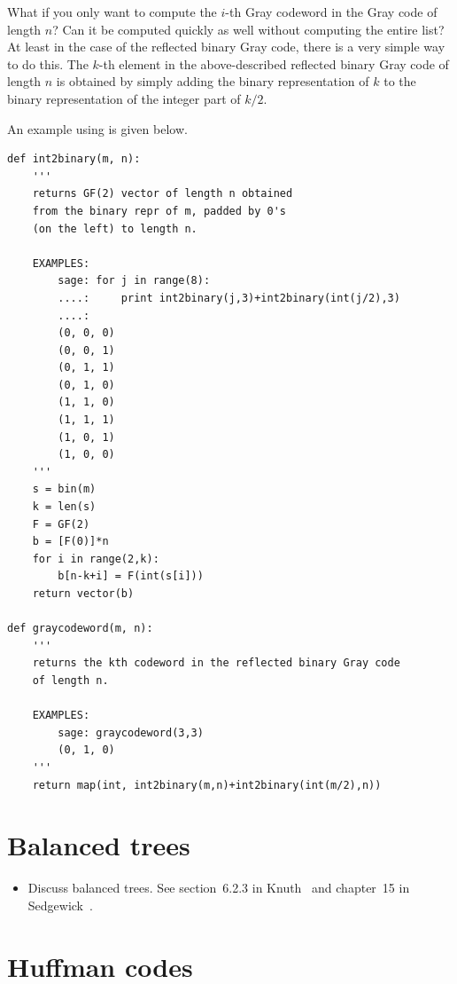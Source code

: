 What if you only want to compute the
$i$-th Gray codeword in the Gray code of length $n$?
Can it be computed quickly as well without computing the
entire list?
At least in the case of the reflected binary Gray code, there
is a very simple way to do this. The $k$-th element in the
above-described reflected binary Gray code of length $n$
is obtained by simply adding the binary representation of
$k$ to the binary representation of the integer part of
$k/2$.

An example using \sage is given below.

\begin{lstlisting}
def int2binary(m, n):
    '''
    returns GF(2) vector of length n obtained
    from the binary repr of m, padded by 0's
    (on the left) to length n.

    EXAMPLES:
        sage: for j in range(8):
        ....:     print int2binary(j,3)+int2binary(int(j/2),3)
        ....:
        (0, 0, 0)
        (0, 0, 1)
        (0, 1, 1)
        (0, 1, 0)
        (1, 1, 0)
        (1, 1, 1)
        (1, 0, 1)
        (1, 0, 0)
    '''
    s = bin(m)
    k = len(s)
    F = GF(2)
    b = [F(0)]*n
    for i in range(2,k):
        b[n-k+i] = F(int(s[i]))
    return vector(b)

def graycodeword(m, n):
    '''
    returns the kth codeword in the reflected binary Gray code
    of length n.

    EXAMPLES:
        sage: graycodeword(3,3)
        (0, 1, 0)
    '''
    return map(int, int2binary(m,n)+int2binary(int(m/2),n))
\end{lstlisting}



\section{Balanced trees}

{\color{red}
\begin{itemize}
\item Discuss balanced trees. See section~6.2.3 in
  Knuth~\cite{Knuth1998c} and chapter~15 in Sedgewick~\cite{Sedgewick1990}.
\end{itemize}
}



\section{Huffman codes}
\label{sec:trees_forests:Huffman_codes}


